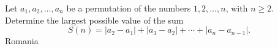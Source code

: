 Let $a_1,a_2,\ldots,a_n$ be a permutation of the numbers $1,2,\ldots,n$,  with $n\geq 2$. Determine the largest possible value of the sum \[ S(n)=|a_2-a_1|+ |a_3-a_2| + \cdots + |a_n-a_{n-1}| . \]Romania